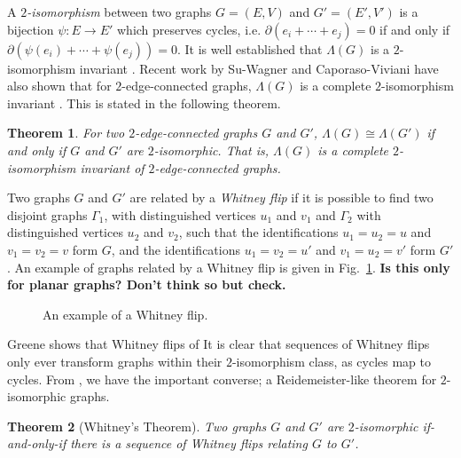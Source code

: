 \documentclass[12pt]{report}
\newcommand{\notered}[1]{{\color{Red} \textbf{#1}}}
\newtheorem*{theorem}{Theorem}
\begin{document}
A \textit{$2$-isomorphism} between two graphs $G = (E, V)$ and $G' = (E', V')$ is a bijection \({\psi: E \longrightarrow E'}\) which preserves cycles, i.e. $\partial(e_{i} + \cdots + e_{j}) = 0$ if and only if $\partial\left(\psi(e_{i}) + \cdots + \psi(e_{j})\right) = 0$. It is well established that $\Lambda(G)$ is a $2$-isomorphism invariant \parencite{lattice-of-flows-cuts}. Recent work by Su-Wagner and Caporaso-Viviani have also shown that for $2$-edge-connected graphs, $\Lambda(G)$ is a complete $2$-isomorphism invariant \cites[Theorem 3.1.1]{torelli-for-graphs-tropical-curves}[Theorem 1]{lattice-of-flows-regular-matroid}. This is stated in the following theorem.


\begin{theorem}
For two $2$-edge-connected graphs $G$ and $G'$, $\Lambda(G) \cong \Lambda(G')$ if and only if $G$ and $G'$ are $2$-isomorphic. That is, $\Lambda(G)$ is a complete $2$-isomorphism invariant of $2$-edge-connected graphs.
\end{theorem}

Two graphs $G$ and $G'$ are related by a \textit{Whitney flip} if it is possible to find two disjoint graphs $\Gamma_{1}$, with distinguished vertices $u_{1}$ and $v_{1}$ and $\Gamma_{2}$ with distinguished vertices $u_{2}$ and $v_{2}$, such that the identifications $u_{1} = u_{2} = u$ and $v_{1} = v_{2} = v$ form $G$, and the identifications $u_{1} = v_{2} = u'$ and $v_{1} = u_{2} = v'$ form $G'$. An example of graphs related by a Whitney flip is given in Fig.~\ref{fig:whitney_flip}. \notered{Is this only for planar graphs? Don't think so but check.}

\begin{figure}[hbt!]
	\centering
	\def\svgscale{0.5}
	
	
	\caption{An example of a Whitney flip.}
	\label{fig:whitney_flip}
\end{figure}

Greene shows that Whitney flips of It is clear that sequences of Whitney flips only ever transform graphs within their $2$-isomorphism class, as cycles map to cycles. From \cite{2-isomorphic-graphs}, we have the important converse; a Reidemeister-like theorem for $2$-isomorphic graphs.

\begin{theorem}[Whitney's Theorem]
Two graphs $G$ and $G'$ are $2$-isomorphic if-and-only-if there is a sequence of Whitney flips relating $G$ to $G'$.
\end{theorem}
\end{document}
